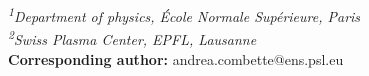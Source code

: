 \documentclass[11pt,openany]{report}
\begin{document}
\begin{titlepage}
{{{{{                    }}


                \raggedright \emph{\textsuperscript{1}\scriptsize{Department of physics, École Normale Supérieure, Paris} \\
                    \scriptsize{\textsuperscript{2}Swiss Plasma Center, EPFL, Lausanne}} \\

                \textbf{Corresponding author:} andrea.combette@ens.psl.eu
            }}
    }
    \begin{multicols}{2}

        \renewcommand{\baselinestretch}{1.1}\normalsize %
        {\footnotesize \sffamily \tableofcontents} %



        \renewcommand{\baselinestretch}{1.0}\normalsize
        \newpage

    \end{multicols}
\end{titlepage}

\fontsize{9}{10}\selectfont
\end{document}
